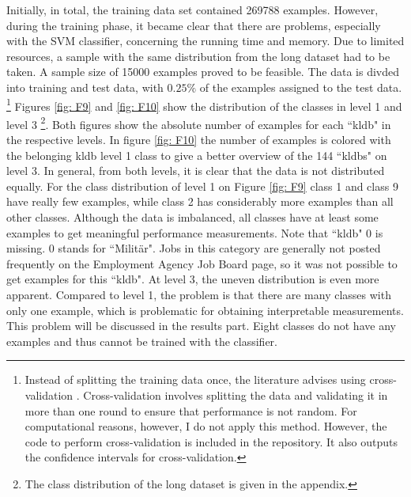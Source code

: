 \documentclass[12pt, a4paper, titlepage]{article}
\begin{document}
Initially, in total, the training data set contained 269788 examples. However, during the training phase, it became clear that there are problems, especially with the \ac{SVM} classifier, concerning the running time and memory. Due to limited resources, a sample with the same distribution from the long dataset had to be taken. A sample size of 15000 examples proved to be feasible. The data is divded into training and test data, with $0.25\%$ of the examples assigned to the test data. \footnote{Instead of splitting the training data once, the literature advises using cross-validation \citep{refaeilzadeh2009}. Cross-validation involves splitting the data and validating it in more than one round to ensure that performance is not random. For computational reasons, however, I do not apply this method. However, the code to perform cross-validation is included in the repository. It also outputs the confidence intervals for cross-validation.} Figures \ref{fig: F9} and \ref{fig: F10} show the distribution of the classes in level 1 and level 3 \footnote{The class distribution of the long dataset is given in the appendix.}. Both figures show the absolute number of examples for each ``kldb" in the respective levels. In figure \ref{fig: F10} the number of examples is colored with the belonging kldb level 1 class to give a better overview of the 144 ``kldbs" on level 3. In general, from both levels, it is clear that the data is not distributed equally. For the class distribution of level 1 on Figure \ref{fig: F9} class 1 and class 9 have really few examples, while class 2 has considerably more examples than all other classes. Although the data is imbalanced, all classes have at least some examples to get meaningful performance measurements. Note that ``kldb" 0  is missing. 0 stands for ``Militär". Jobs in this category are generally not posted frequently on the Employment Agency Job Board page, so it was not possible to get examples for this ``kldb". At level 3, the uneven distribution is even more apparent. Compared to level 1, the problem is that there are many classes with only one example, which is problematic for obtaining interpretable measurements. This problem will be discussed in the results part. Eight classes do not have any examples and thus cannot be trained with the classifier.   
\end{document}
